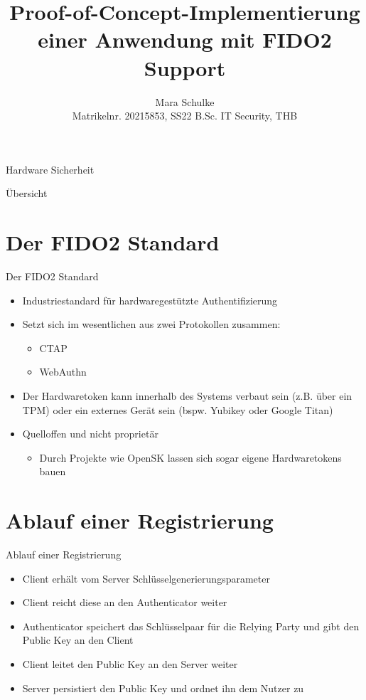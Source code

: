 \documentclass{beamer}
\title{Proof-of-Concept-Implementierung einer Anwendung mit FIDO2 Support}
\author{Mara Schulke\\\tiny{Matrikelnr. 20215853, SS22 B.Sc. IT Security, THB}}
\begin{document}
\begin{frame}
	Hardware Sicherheit
	\vspace{1em}
	\titlepage
\end{frame}

\begin{frame}{Übersicht}
	\tableofcontents
\end{frame}

\section{Der FIDO2 Standard}
\begin{frame}{Der FIDO2 Standard}
	\begin{itemize}
		\item Industriestandard für hardwaregestützte Authentifizierung
		\item Setzt sich im wesentlichen aus zwei
			Protokollen zusammen:
			\begin{itemize}
				\item CTAP
				\item WebAuthn
			\end{itemize}
		\item Der Hardwaretoken kann innerhalb des Systems verbaut sein (z.B.
			über ein TPM) oder ein externes Gerät sein (bspw. Yubikey oder
			Google Titan)
		\item Quelloffen und nicht proprietär
			\begin{itemize}
				\item Durch Projekte wie OpenSK lassen sich sogar eigene
					Hardwaretokens bauen
			\end{itemize}
	\end{itemize}
\end{frame}

\section{Ablauf einer Registrierung}
\begin{frame}{Ablauf einer Registrierung}
	\begin{itemize}
		\item Client erhält vom Server Schlüsselgenerierungsparameter
		\item Client reicht diese an den Authenticator weiter
		\item Authenticator speichert das Schlüsselpaar für die Relying Party und gibt den Public Key an den Client
		\item Client leitet den Public Key an den Server weiter
		\item Server persistiert den Public Key und ordnet ihn dem Nutzer zu
	\end{itemize}
\end{frame}
\end{document}
